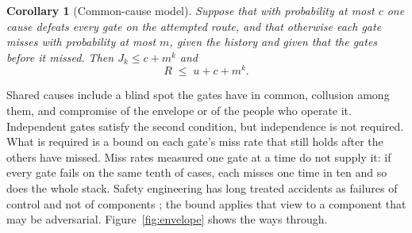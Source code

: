 \documentclass[10pt,twocolumn]{article}
\theoremstyle{plain}
\newtheorem{corollary}{Corollary}
\theoremstyle{definition}
\begin{document}
\begin{corollary}[Common-cause model]\label{cor:beta}
Suppose that with probability at most $c$ one cause defeats every gate on the attempted
route, and that otherwise each gate misses with probability at most $m$, given the history
and given that the gates before it missed. Then $J_{k}\le c+m^{k}$ and
\[
R \;\le\; u + c + m^{k}.
\]
\end{corollary}

Shared causes include a blind spot the gates have in common, collusion among them, and
compromise of the envelope or of the people who operate it. Independent gates satisfy the
second condition, but independence is not required. What is required is a bound on each
gate's miss rate that still holds after the others have missed. Miss rates measured one gate
at a time do not supply it: if every gate fails on the same tenth of cases, each misses one
time in ten and so does the whole stack. Safety engineering has long treated accidents as
failures of control and not of components \cite{leveson2011}; the bound applies that view to
a component that may be adversarial. Figure~\ref{fig:envelope} shows the ways through.
\end{document}
